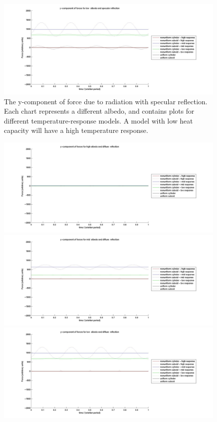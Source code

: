 \begin{description}
\begin{figure}
       \includegraphics[width=160mm]{figs/Plate_mod/Fy_ref_spc_alb_low_.jpg}
       \caption{The y-component of force due to radiation with specular
       reflection.  Each chart represents a different albedo, and contains
       plots for different temperature-response models.  A model with low
       heat capacity will have a high temperature response.}
       \label{fig:ivv_platemod_fig3}
     \end{figure}
     \begin{figure}
       \includegraphics[width=160mm]{figs/Plate_mod/Fy_ref_dif_alb_high.jpg}
       \includegraphics[width=160mm]{figs/Plate_mod/Fy_ref_dif_alb_mid_.jpg}
       \includegraphics[width=160mm]{figs/Plate_mod/Fy_ref_dif_alb_low_.jpg}

\end{figure}
\end{description}
